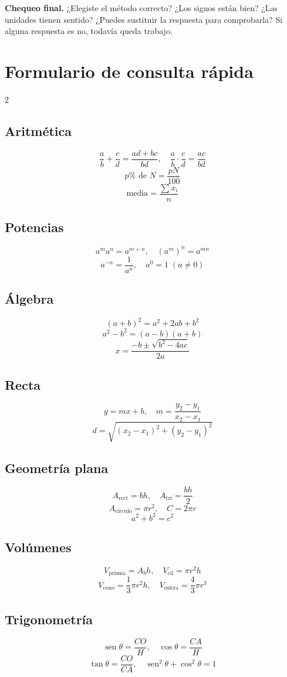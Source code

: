 \documentclass[10pt,oneside,openany]{book}
\newcommand{\sen}{\operatorname{sen}}\newcommand{\Prob}{\operatorname{P}}
\begin{document}
\begin{idea}\textbf{Chequeo final.} ¿Elegiste el método correcto? ¿Los signos están bien? ¿Las unidades tienen sentido? ¿Puedes sustituir la respuesta para comprobarla? Si alguna respuesta es no, todavía queda trabajo.\end{idea}




\appendix
\chapter{Formulario de consulta rápida}
\small
\begin{multicols}{2}
\section*{Aritmética}
\[
\frac ab+\frac cd=\frac{ad+bc}{bd},\quad
\frac ab\cdot\frac cd=\frac{ac}{bd}
\]
\[
p\%\text{ de }N=\frac{pN}{100}
\]
\[
\text{media}=\frac{\sum x_i}{n}
\]
\section*{Potencias}
\[
a^ma^n=a^{m+n},\quad (a^m)^n=a^{mn}
\]
\[
a^{-n}=\frac1{a^n},\quad a^0=1\;(a\neq0)
\]
\section*{Álgebra}
\[
(a+b)^2=a^2+2ab+b^2
\]
\[
a^2-b^2=(a-b)(a+b)
\]
\[
x=\frac{-b\pm\sqrt{b^2-4ac}}{2a}
\]
\section*{Recta}
\[
y=mx+b,\quad m=\frac{y_2-y_1}{x_2-x_1}
\]
\[
d=\sqrt{(x_2-x_1)^2+(y_2-y_1)^2}
\]
\section*{Geometría plana}
\[
A_{\text{rect}}=bh,\quad A_{\text{tri}}=\frac{bh}{2}
\]
\[
A_{\text{círculo}}=\pi r^2,\quad C=2\pi r
\]
\[
a^2+b^2=c^2
\]
\section*{Volúmenes}
\[
V_{\text{prisma}}=A_bh,\quad V_{\text{cil}}=\pi r^2h
\]
\[
V_{\text{cono}}=\frac13\pi r^2h,\quad
V_{\text{esfera}}=\frac43\pi r^3
\]
\section*{Trigonometría}
\[
\sen\theta=\frac{CO}{H},\quad
\cos\theta=\frac{CA}{H}
\]
\[
\tan\theta=\frac{CO}{CA},\quad
\sen^2\theta+\cos^2\theta=1
\]

\end{multicols}
\end{document}
